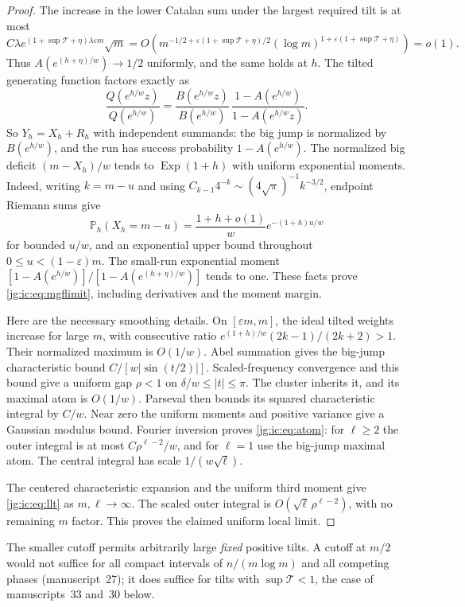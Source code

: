 \documentclass[11pt,a4paper]{article}
\theoremstyle{definition}\newaliascnt{definition}{theorem}
\theoremstyle{remark}\newaliascnt{remark}{theorem}
\newcommand{\ljP}{\mathbb P}
\begin{document}
\begin{proof}
The increase in the lower Catalan sum under the largest required tilt is at
most
\[
 C\lambda e^{(1+\sup\mathcal T+\eta)\lambda\varepsilon m}\sqrt m
 =O\!\left(
 m^{-1/2+\varepsilon(1+\sup\mathcal T+\eta)/2}
 (\log m)^{1+\varepsilon(1+\sup\mathcal T+\eta)}
 \right)=o(1).
\]
Thus $A(e^{(h+\eta)/w})\to1/2$ uniformly, and the same holds at $h$. The
tilted generating function factors exactly as
\begin{equation}\label{jg:ra:eq:tiltedpgf}
 \frac{Q(e^{h/w}z)}{Q(e^{h/w})}
 =\frac{B(e^{h/w}z)}{B(e^{h/w})}\,
       \frac{1-A(e^{h/w})}{1-A(e^{h/w}z)}.
\end{equation}
So $Y_h=X_h+R_h$ with independent summands: the big jump is normalized by
$B(e^{h/w})$, and the run has success probability $1-A(e^{h/w})$. The normalized
big deficit $(m-X_h)/w$ tends to $\operatorname{Exp}(1+h)$ with uniform
exponential moments. Indeed, writing $k=m-u$ and using
$C_{k-1}4^{-k}\sim(4\sqrt\pi)^{-1}k^{-3/2}$, endpoint Riemann sums give
\[
 \ljP_h(X_h=m-u)=\frac{1+h+o(1)}w e^{-(1+h)u/w}
\]
for bounded $u/w$, and an exponential upper bound throughout
$0\le u<(1-\varepsilon)m$. The small-run exponential moment
$[1-A(e^{h/w})]/[1-A(e^{(h+\eta)/w})]$ tends to one. These facts prove
\eqref{jg:ic:eq:mgflimit}, including derivatives and the moment margin.

Here are the necessary smoothing details. On $[\varepsilon m,m]$, the ideal
tilted weights increase for large $m$, with consecutive ratio
$e^{(1+h)/w}(2k-1)/(2k+2)>1$. Their normalized maximum is $O(1/w)$. Abel
summation gives the big-jump characteristic bound $C/[w|\sin(t/2)|]$.
Scaled-frequency convergence and this bound give a uniform gap $\rho<1$ on
$\delta/w\le|t|\le\pi$. The cluster inherits it, and its maximal atom is
$O(1/w)$. Parseval then bounds its squared characteristic integral by $C/w$.
Near zero the uniform moments and positive variance give a Gaussian modulus
bound. Fourier inversion proves \eqref{jg:ic:eq:atom}: for $\ell\ge2$ the outer
integral is at most $C\rho^{\ell-2}/w$, and for $\ell=1$ use the big-jump
maximal atom. The central integral has scale $1/(w\sqrt\ell)$.

The centered characteristic expansion and the uniform third moment give
\eqref{jg:ic:eq:llt} as $m,\ell\to\infty$. The scaled outer integral is
$O(\sqrt\ell\,\rho^{\ell-2})$, with no remaining $m$ factor. This proves the
claimed uniform local limit.
\end{proof}

The smaller cutoff permits arbitrarily large \emph{fixed} positive tilts. A
cutoff at $m/2$ would not suffice for all compact intervals of $n/(m\log m)$
and all competing phases (manuscript~27); it does suffice for tilts with
$\sup\mathcal T<1$, the case of manuscripts~33 and~30 below.
\end{document}
